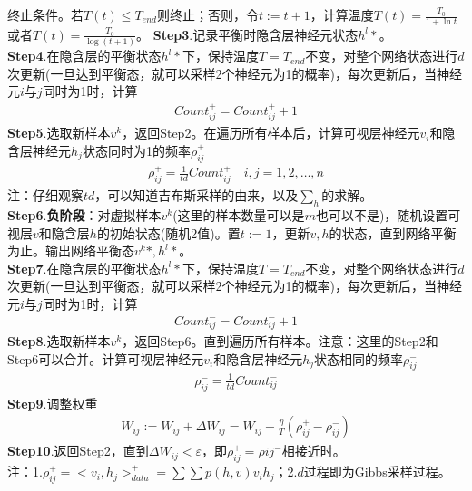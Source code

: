 {            终止条件。若$T(t) \leqslant T_{end}$则终止；否则，令$t:=t+1$，计算温度$T(t) = \frac{T_0}{1+\ln t}$或者$T(t) = \frac{T_0}{\log (t+1)}$。
            \textbf{Step3}.记录平衡时隐含层神经元状态$h^l*$。\\
            \textbf{Step4}.在隐含层的平衡状态$h^l*$下，保持温度$T= T_{end}$不变，对整个网络状态进行$d$次更新(一旦达到平衡态，就可以采样2个神经元为1的概率)，每次更新后，当神经元$i$与$j$同时为1时，计算
            \begin{align*}
            Count_{ij}^+ = Count_{ij}^+ +1
            \end{align*}
            \textbf{Step5}.选取新样本$v^k$，返回Step2。在遍历所有样本后，计算可视层神经元$v_i$和隐含层神经元$h_j$状态同时为1的频率$\rho_{ij}^+$
            \begin{align*}
            \rho_{ij}^+ = \frac{1}{td} Count_{ij}^+ \quad i,j =1,2,\dots,n
            \end{align*}
            注：仔细观察$td$，可以知道吉布斯采样的由来，以及$\sum_h$的求解。\\
            \textbf{Step6}.\textbf{负阶段}：对虚拟样本$v^k$(这里的样本数量可以是$m$也可以不是)，随机设置可视层$v$和隐含层$h$的初始状态(随机2值)。置$t:=1$，更新$v,h$的状态，直到网络平衡为止。输出网络平衡态$v^k*,h^l*$。\\
            \textbf{Step7}.在隐含层的平衡状态$h^l*$下，保持温度$T= T_{end}$不变，对整个网络状态进行$d$次更新(一旦达到平衡态，就可以采样2个神经元为1的概率)，每次更新后，当神经元$i$与$j$同时为1时，计算
            \begin{align*}
            Count_{ij}^- = Count_{ij}^- +1
            \end{align*}
            \textbf{Step8}.选取新样本$v^k$，返回Step6。直到遍历所有样本。注意：这里的Step2和Step6可以合并。计算可视层神经元$v_i$和隐含层神经元$h_j$状态相同的频率$\rho_{ij}^-$
            \begin{align*}
            \rho_{ij}^- = \frac{1}{td}Count_{ij}^-
            \end{align*}
            \textbf{Step9}.调整权重
            \begin{align*}
            W_{ij} := W_{ij} +\Delta W_{ij} = W_{ij} + \frac{\eta}{T}(\rho_{ij}^+-\rho_{ij}^-)
            \end{align*}
            \textbf{Step10}.返回Step2，直到$\Delta W_{ij}<\varepsilon$，即$\rho_{ij}^+ = \rho{ij}^-$相接近时。\\
            注：1.$\rho_{ij}^+ = \big < v_i,h_j\big >_{data}^+ = \sum\sum p(h,v)v_ih_j$；2.$d$过程即为Gibbs采样过程。

}
